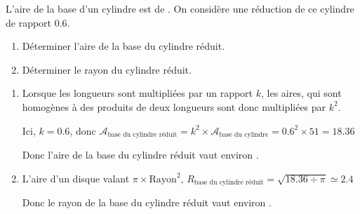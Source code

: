 \begin{exercice*}
    L'aire de la base d'un cylindre est de .
    On considère une réduction de ce cylindre de rapport \num{0.6}.
    \begin{enumerate}
        \item Déterminer l'aire de la base du cylindre réduit.
        \item Déterminer le rayon du cylindre réduit.
    \end{enumerate}

\end{exercice*}
\begin{corrige}
    \begin{enumerate}
        \item Lorsque les longueurs sont multipliées par un rapport $k$, les aires, qui sont homogènes à 
    des produits de deux longueurs sont donc multipliées par $k^2$.

    Ici, $k=\num{0.6}$, donc $\mathcal{A}_{\text{base du cylindre réduit}} = k^2\times \mathcal{A}_{\text{base du cylindre}} = \num{0.6}^2\times 51 = \num{18.36}$

    Donc l'aire de la base du cylindre réduit vaut environ .
        \item L'aire d'un disque valant $\pi \times \text{Rayon}^2$, $R_\text{base du cylindre réduit}=\sqrt{\num{18.36}\div\pi} \simeq \num{2.4}$

    Donc le rayon de la base du cylindre réduit vaut environ .
    \end{enumerate}
\end{corrige}

